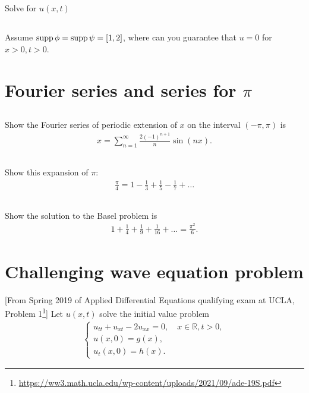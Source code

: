 \documentclass[11pt,letterpaper]{report}
\begin{document}
\subsection{}
Solve for $u(x,t)$

\subsection{}
Assume $\operatorname{supp}\phi = \operatorname{supp}\psi=[1,2]$, where can you guarantee that $u=0$ for $x>0, t>0$. 

\section{Fourier series and series for $\pi$}
\subsection{}
Show the Fourier series of periodic extension of $x$ on the interval $(-\pi,\pi)$ is
\begin{align}
    x = \sum_{n=1}^\infty \frac{2(-1)^{n+1}}{n}\sin(nx).
\end{align}

\subsection{}
Show this expansion of $\pi$:
\begin{align}
    \frac{\pi}{4} = 1-\frac{1}{3}+\frac{1}{5}-\frac{1}{7}+\dots
\end{align}

\subsection{}
Show the solution to the Basel problem is
\begin{align}
    1+\frac{1}{4}+\frac{1}{9}+\frac{1}{16} + \dots = \frac{\pi^2}{6}.
\end{align}

\section{Challenging wave equation problem}
[From Spring 2019 of Applied Differential Equations qualifying exam at UCLA, Problem 1\footnote{\url{https://ww3.math.ucla.edu/wp-content/uploads/2021/09/ade-19S.pdf}}]  Let $u(x,t)$ solve the initial value problem
\begin{align}
    \begin{cases}
        u_{tt}+u_{xt}-2u_{xx} = 0,\quad x\in\mathbb{R}, t>0,\\
        u(x,0) = g(x),\\
        u_t(x,0) = h(x).
    \end{cases}
\end{align}
\end{document}
